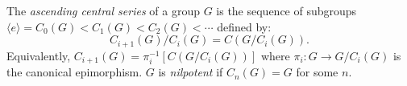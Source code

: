 The \emph{ascending central series} of a group $G$ is the sequence of subgroups $\langle e \rangle = C_0(G) < C_1(G) < C_2(G) < \cdots$ defined by:
$$C_{i+1}(G)/C_i(G) = C(G/C_i(G)).$$
Equivalently, $C_{i+1}(G) = \pi_i^{-1}[C(G/C_i(G))]$ where $\pi_i: G \to G/C_i(G)$ is the canonical epimorphism. $G$ is \emph{nilpotent} if $C_n(G) = G$ for some $n$.
